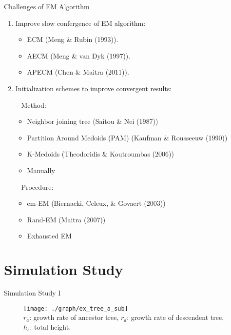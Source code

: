 \documentclass{beamer}
\begin{document}
\begin{frame}{Challenges of EM Algorithm}

\begin{enumerate}
\item Improve slow confergence of EM algorithm:
\begin{itemize}
\item ECM (Meng \& Rubin (1993)).
\item AECM (Meng \& van Dyk (1997)).
\item APECM (Chen \& Maitra (2011)).
\end{itemize}

\item Initialization schemes to improve convergent results:

-- Method:
\begin{itemize}
\item Neighbor joining tree (Saitou \& Nei (1987))
\item Partition Around Medoids (PAM) (Kaufman \& Rousseeuw (1990))
\item K-Medoids (Theodoridis \& Koutroumbas (2006))
\item Manually
\end{itemize}

-- Procedure:
\begin{itemize}
\item em-EM (Biernacki, Celeux, \& Govaert (2003))
\item Rand-EM (Maitra (2007))
\item Exhausted EM
\end{itemize}

\end{enumerate}

\end{frame}


\section{Simulation Study}

\begin{frame}{Simulation Study I}

\vspace{-0.1cm}
\begin{center}
\begin{figure}
  \texttt{[image: ./graph/ex\_tree\_a\_sub]}
  \\
  \vspace{-0.2cm}
  {\tiny
  $r_a$: growth rate of ancestor tree,
  $r_d$: growth rate of descendent tree,
  $h_s$: total height.}
\end{figure}
\end{center}

\end{frame}
\end{document}
